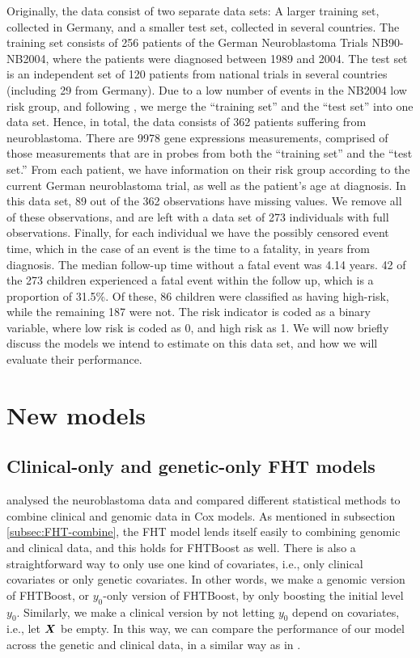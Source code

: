Originally, the data consist of two separate data sets:
A larger training set, collected in Germany, and a smaller test set, collected in several countries.
The training set consists of 256 patients of the German Neuroblastoma Trials NB90-NB2004, where the patients were diagnosed between 1989 and 2004.
The test set is an independent set of 120 patients from national trials in several countries (including 29 from Germany).
Due to a low number of events in the NB2004 low risk group, and following \citet{bovelstad2009}, we merge the ``training set'' and the ``test set'' into one data set.
Hence, in total, the data consists of 362 patients suffering from neuroblastoma.
There are 9978 gene expressions measurements, comprised of those measurements that are in probes from both the ``training set'' and the ``test set.''
From each patient, we have information on their risk group according to the current German neuroblastoma trial, as well as the patient's age at diagnosis.
In this data set, 89 out of the 362 observations have missing values.
We remove all of these observations, and are left with a data set of 273 individuals with full observations.
Finally, for each individual we have the possibly censored event time, which in the case of an event is the time to a fatality, in years from diagnosis.
The median follow-up time without a fatal event was 4.14 years.
42 of the 273 children experienced a fatal event within the follow up, which is a proportion of 31.5\%.
Of these, 86 children were classified as having high-risk, while the remaining 187 were not.
The risk indicator is coded as a binary variable, where low risk is coded as 0, and high risk as 1.
We will now briefly discuss the models we intend to estimate on this data set, and how we will evaluate their performance.

\section{New models}
\subsection{Clinical-only and genetic-only FHT models}
\citet{bovelstad2009} analysed the neuroblastoma data and compared different statistical methods to combine clinical and genomic data in Cox models.
As mentioned in subsection \ref{subsec:FHT-combine}, the FHT model lends itself easily to combining genomic and clinical data, and this holds for FHTBoost as well.
There is also a straightforward way to only use one kind of covariates, i.e., only clinical covariates or only genetic covariates.
In other words, we make a genomic version of FHTBoost, or $y_0$-only version of FHTBoost, by only boosting the initial level $y_0$.
Similarly, we make a clinical version by not letting $y_0$ depend on covariates, i.e., let $\bm{X}$ be empty.
In this way, we can compare the performance of our model across the genetic and clinical data, in a similar way as in \citet{bovelstad2009}.

